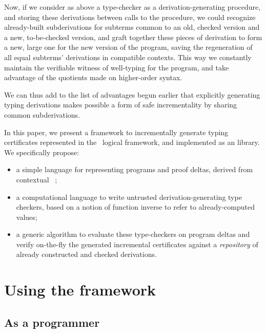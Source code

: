 \documentclass{llncs}
\begin{document}
Now, if we consider as above a type-checker as a derivation-generating
procedure, and storing these derivations between calls to the
procedure, we could recognize already-built subderivations for
subterms common to an old, checked version and a new, to-be-checked
version, and graft together these pieces of derivation to form a new,
large one for the new version of the program, saving the regeneration
of all equal subterms' derivations in compatible contexts. This way we
constantly maintain the verifiable witness of well-typing for the
program, and take advantage of the quotients made on higher-order
syntax.

We can thus add to the list of advantages begun earlier that
explicitly generating typing derivations makes possible a form of safe
incrementality by sharing common subderivations.

In this paper, we present a framework to incrementally generate typing
certificates represented in the \LF\ logical framework, and implemented
as an  library. We specifically propose:
\begin{itemize}
\item a simple language for representing programs and proof
  deltas, derived from contextual \LF\ \cite{nanevski2008contextual};
\item a computational language to write untrusted
  derivation-generating type checkers, based on a notion of function
  inverse %
  to refer to already-computed values;
\item a generic algorithm to evaluate these type-checkers on program
  deltas and verify on-the-fly the generated incremental certificates
  against a \emph{repository} of already constructed and checked
  derivations.
\end{itemize}

\section{Using the framework}

\subsection{As a programmer}
\label{sec:use-incremental}

\end{document}
